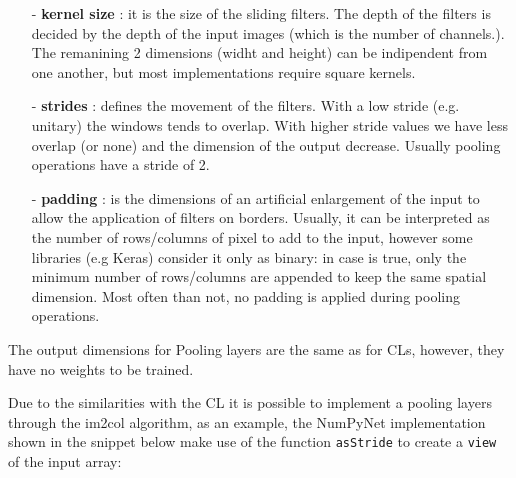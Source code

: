 \documentclass[12pt,a4paper]{report}
\begin{document}
\begin{itemize}
 \setlength\itemsep{-0.2em}
 \item [-] {\bf kernel size} : it is the size of the sliding filters. The depth of the filters is decided by the depth of the input images (which is the number of channels.). The remanining 2 dimensions (widht and height) can be indipendent from one another, but most implementations require square kernels.
 \item [-] {\bf strides} : defines the movement of the filters. With a low stride (e.g. unitary) the windows tends to overlap. With higher stride values we have less overlap (or none) and the dimension of the output decrease. Usually pooling operations have a stride of 2.
 \item [-] {\bf padding} : is the dimensions of an artificial enlargement of the input to allow the application of filters on borders. Usually, it can be interpreted as the number of rows/columns of pixel to add to the input, however some libraries (e.g Keras) consider it only as binary: in case is true, only the minimum number of rows/columns are appended to keep the same spatial dimension. Most often than not, no padding is applied during pooling operations.
\end{itemize}

The output dimensions for Pooling layers are the same as for CLs, however, they have no weights to be trained.

Due to the similarities with the CL it is possible to implement a pooling layers through the im2col algorithm, as an example, the NumPyNet implementation shown in the snippet below make use of the function \texttt{asStride} to create a \texttt{view} of the input array: 
\end{document}
